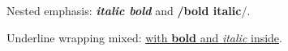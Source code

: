 Nested emphasis: \emph{\textbf{italic bold}} and \textbf{/bold italic}/.

Underline wrapping mixed: \underline{with \textbf{bold} and \emph{italic} inside}.


